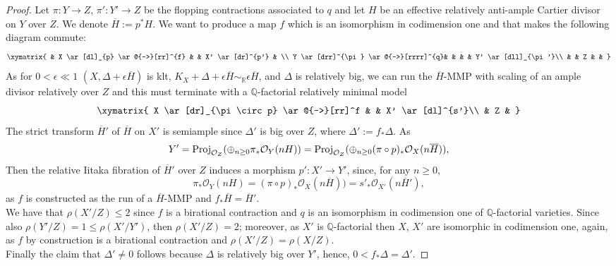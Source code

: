\documentclass{amsart}[12pt,a4paper]
\theoremstyle{definition}
\begin{document}
\begin{proof}
Let $\pi \colon Y\rightarrow Z$, $\pi' \colon Y'\rightarrow Z$ be the flopping contractions associated to $q$ and let $H$ be an effective relatively anti-ample Cartier divisor on $Y$ over $Z$.
We denote $\overline{H}:=p^\ast H$.
We want to produce a map $f$ which is an isomorphism in codimension one and that makes the following diagram commute: 
\begin{displaymath}
	\xymatrix{
		& X \ar[dl]_{p} \ar@{-->}[rr]^{f} & & X' \ar[dr]^{p'} & \\
		Y \ar[drr]^{\pi} \ar@{-->}[rrrr]^{q}& & & & Y' \ar[dll]_{\pi'}\\
	 	& & Z &	&	
	}
\end{displaymath}	
As for $0<\epsilon\ll 1$ $(X, \Delta+\epsilon \overline{H})$ is klt, $K_X+\Delta + \epsilon \overline{H}\sim_\mathbb{R} \epsilon \overline{H}$, and $\Delta$ is relatively big, we can run the $\overline{H}$-MMP with scaling of an ample divisor relatively over $Z$ and this must terminate with a $\mathbb{Q}$-factorial relatively minimal model 
\[
\xymatrix{
X \ar[dr]_{\pi \circ p} \ar@{-->}[rr]^f & & X' \ar[dl]^{s'}\\
& Z &
}
\]
\noindent
The strict transform $\overline{H}'$ of $\overline{H}$ on $X'$ is semiample since $\Delta'$ is big over $Z$, where $\Delta':=f_\ast \Delta$.
As 
\[
Y'={\rm Proj}_{\mathcal{O}_{Z}}(\oplus_{n \geq 0} \pi_\ast \mathcal{O}_Y(nH))= {\rm Proj}_{\mathcal{O}_{Z}}(\oplus_{n \geq 0} (\pi \circ p)_\ast \mathcal{O}_X(n\overline{H})),
\] 
\noindent
Then the relative Iitaka fibration of $\overline{H}'$ over $Z$ induces a morphism $p' \colon X' \to Y'$, since, for any $n \geq 0$, 
\[
\pi_\ast \mathcal{O}_Y(nH) = (\pi \circ p)_\ast \mathcal{O}_X(n\overline{H})) = s'_\ast \mathcal{O}_{X'}(n\overline{H}'),
\]
\noindent
as $f$ is constructed as the run of a $\overline{H}$-MMP and $f_\ast \overline{H}=\overline{H}'$.
\\
We have that $\rho(X'/Z) \leq 2$ since $f$ is a birational contraction and $q$ is an isomorphism in codimension one of $\mathbb{Q}$-factorial varieties.
Since also $\rho(Y'/Z)=1\leq \rho(X'/Y')$, then $\rho(X'/Z)=2$; 
moreover, as $X'$ is $\mathbb{Q}$-factorial then $X$, $X'$ are isomorphic in codimension one, again, as $f$ by construction is a birational contraction and $\rho(X'/Z)= \rho(X/Z)$.
\\
Finally the claim that $\Delta' \neq 0$ follows because $\Delta$ is relatively big over $Y'$, hence, $0<f_\ast \Delta =\Delta'$.
\end{proof}
\end{document}
